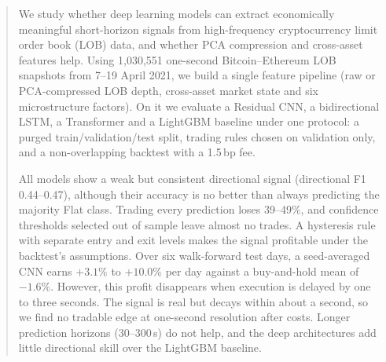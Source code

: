 

\begin{abstract}
We study whether deep learning models can extract economically meaningful
short-horizon signals from high-frequency cryptocurrency limit order book (LOB)
data, and whether PCA compression and cross-asset features help. Using 1,030,551
one-second Bitcoin--Ethereum LOB snapshots from 7--19 April 2021, we build a single
feature pipeline (raw or PCA-compressed LOB depth, cross-asset market state and six
microstructure factors). On it we evaluate a Residual CNN, a bidirectional LSTM, a
Transformer and a LightGBM baseline under one protocol: a purged
train/validation/test split, trading rules chosen on validation only, and a
non-overlapping backtest with a 1.5\,bp fee.

All models show a weak but consistent directional signal (directional F1
0.44--0.47), although their accuracy is no better than always predicting the majority
Flat class. Trading every prediction loses 39--49\%, and confidence thresholds
selected out of sample leave almost no trades. A hysteresis rule with separate entry
and exit levels makes the signal profitable under the backtest's assumptions. Over six
walk-forward test days, a seed-averaged CNN earns $+3.1\%$ to $+10.0\%$ per day
against a buy-and-hold mean of $-1.6\%$. However, this profit disappears when
execution is delayed by one to three seconds. The signal is real but decays within about
a second, so we find no tradable edge at one-second resolution after costs. Longer
prediction horizons (30--300\,s) do not help, and the deep architectures add little
directional skill over the LightGBM baseline.
\end{abstract}


